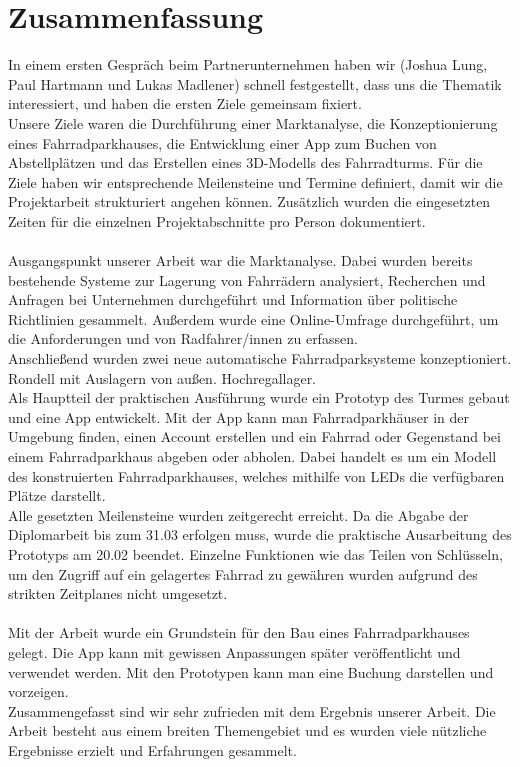 \section{Zusammenfassung}
In einem ersten Gespräch beim Partnerunternehmen haben wir (Joshua Lung, Paul Hartmann und Lukas Madlener) schnell festgestellt, dass uns die Thematik interessiert, und haben die ersten Ziele gemeinsam fixiert. \\
Unsere Ziele waren die Durchführung einer Marktanalyse, die Konzeptionierung eines Fahrradparkhauses, die Entwicklung einer App zum Buchen von Abstellplätzen und das Erstellen eines 3D-Modells des Fahrradturms. Für die Ziele haben wir entsprechende Meilensteine und Termine definiert, damit wir die Projektarbeit strukturiert angehen können. Zusätzlich wurden die eingesetzten Zeiten für die einzelnen Projektabschnitte pro Person dokumentiert.\\ \\
Ausgangspunkt unserer Arbeit war die Marktanalyse. Dabei wurden bereits bestehende Systeme zur Lagerung von Fahrrädern analysiert, Recherchen und Anfragen bei Unternehmen durchgeführt und Information über politische Richtlinien gesammelt. Außerdem wurde eine Online-Umfrage durchgeführt, um die Anforderungen und von Radfahrer/innen zu erfassen.\\
Anschließend wurden zwei neue automatische Fahrradparksysteme konzeptioniert. Rondell mit Auslagern von außen. Hochregallager.\\
Als Hauptteil der praktischen Ausführung wurde ein Prototyp des Turmes gebaut und eine App entwickelt. Mit der App kann man Fahrradparkhäuser in der Umgebung finden, einen Account erstellen und ein Fahrrad oder Gegenstand bei einem Fahrradparkhaus abgeben oder abholen. Dabei handelt es um ein Modell des konstruierten Fahrradparkhauses, welches mithilfe von LEDs die verfügbaren Plätze darstellt. \\
Alle gesetzten Meilensteine wurden zeitgerecht erreicht. Da die Abgabe der Diplomarbeit bis zum 31.03 erfolgen muss, wurde die praktische Ausarbeitung des Prototyps am 20.02 beendet. Einzelne Funktionen wie das Teilen von Schlüsseln, um den Zugriff auf ein gelagertes Fahrrad zu gewähren wurden aufgrund des strikten Zeitplanes nicht umgesetzt.\\ \\
Mit der Arbeit wurde ein Grundstein für den Bau eines Fahrradparkhauses gelegt. Die App kann mit gewissen Anpassungen später veröffentlicht und verwendet werden. Mit den Prototypen kann man eine Buchung darstellen und vorzeigen.\\
Zusammengefasst sind wir sehr zufrieden mit dem Ergebnis unserer Arbeit. Die Arbeit besteht aus einem breiten Themengebiet und es wurden viele nützliche Ergebnisse erzielt und Erfahrungen gesammelt.
